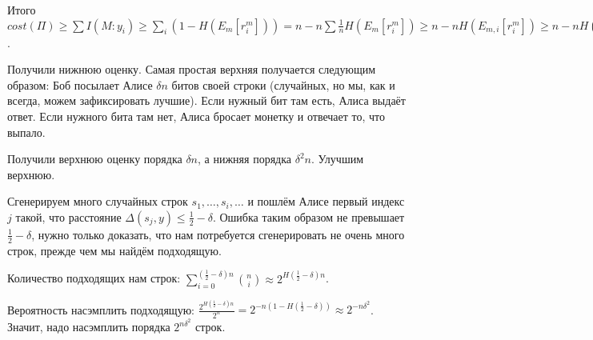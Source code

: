Итого $cost(\Pi) \geq \sum I(M : y_i) \geq \sum_i (1 - H(E_m[r_i^m])) = n - n \sum \frac{1}{n} H(E_m[r_i^m]) \geq n - n H(E_{m, i}[r_i^m]) \geq n - n H(\frac{1}{2} - \delta) = \Omega(\delta^2n)$.

Получили нижнюю оценку. Самая простая верхняя получается следующим образом: Боб посылает Алисе $\delta n$ битов своей строки (случайных, но мы, как и всегда, можем зафиксировать лучшие). Если нужный бит там есть, Алиса выдаёт ответ. Если нужного бита там нет, Алиса бросает монетку и отвечает то, что выпало.

Получили верхнюю оценку порядка $\delta n$, а нижняя порядка $\delta^2 n$. Улучшим верхнюю.

Сгенерируем много случайных строк $s_1, \ldots, s_i, \ldots$ и пошлём Алисе первый индекс $j$ такой, что расстояние $\Delta(s_j, y) \leq \frac{1}{2} - \delta$. Ошибка таким образом не превышает $\frac{1}{2} - \delta$, нужно только доказать, что нам потребуется сгенерировать не очень много строк, прежде чем мы найдём подходящую.

Количество подходящих нам строк: $\sum_{i = 0}^{(\frac{1}{2} - \delta)n} {{n}\choose{i}} \approx 2^{H(\frac{1}{2} - \delta)n}$.

Вероятность насэмплить подходящую: $\frac{2^{H(\frac{1}{2} - \delta)n}}{2^n} = 2^{-n(1 - H(\frac{1}{2} - \delta))} \approx 2^{-n\delta^2}$. Значит, надо насэмплить порядка $2^{n\delta^2}$ строк.